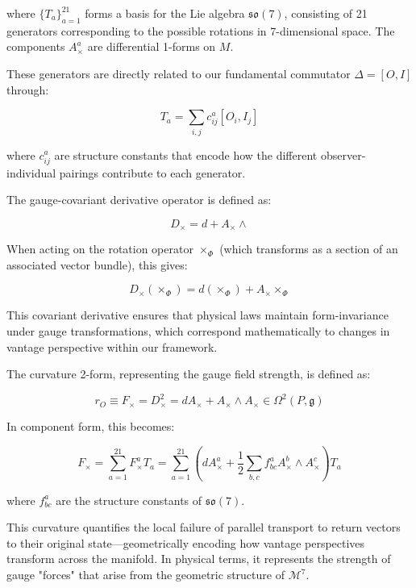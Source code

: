 \documentclass{article}
\begin{document}
where $\{T_a\}_{a=1}^{21}$ forms a basis for the Lie algebra $\mathfrak{so}(7)$, consisting of 21 generators corresponding to the possible rotations in 7-dimensional space. The components $A^a_{\times}$ are differential 1-forms on $M$.

These generators are directly related to our fundamental commutator $\Delta = [O, I]$ through:

\begin{equation}
T_a = \sum_{i,j} c^a_{ij} [O_i, I_j]
\end{equation}

where $c^a_{ij}$ are structure constants that encode how the different observer-individual pairings contribute to each generator.

The gauge-covariant derivative operator is defined as:

\begin{equation}
D_{\times} = d + A_{\times} \wedge
\end{equation}

When acting on the rotation operator $\times_{\Phi}$ (which transforms as a section of an associated vector bundle), this gives:

\begin{equation}
D_{\times}(\times_{\Phi}) = d(\times_{\Phi}) + A_{\times} \times_{\Phi}
\end{equation}

This covariant derivative ensures that physical laws maintain form-invariance under gauge transformations, which correspond mathematically to changes in vantage perspective within our framework.

The curvature 2-form, representing the gauge field strength, is defined as:

\begin{equation}
r_O \equiv F_{\times} = D_{\times}^2 = dA_{\times} + A_{\times} \wedge A_{\times} \in \Omega^2(P, \mathfrak{g})
\end{equation}

In component form, this becomes:

\begin{equation}
F_{\times} = \sum_{a=1}^{21} F^a_{\times} T_a = \sum_{a=1}^{21} (dA^a_{\times} + \frac{1}{2}\sum_{b,c} f^a_{bc} A^b_{\times} \wedge A^c_{\times}) T_a
\end{equation}

where $f^a_{bc}$ are the structure constants of $\mathfrak{so}(7)$.

This curvature quantifies the local failure of parallel transport to return vectors to their original state—geometrically encoding how vantage perspectives transform across the manifold. In physical terms, it represents the strength of gauge "forces" that arise from the geometric structure of $\mathcal{M}^7$.
\end{document}
